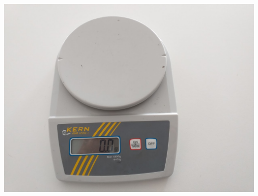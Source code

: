 \documentclass[12pt,a4paper,oneside]{book}
\newcounter{testexample} %
\theoremstyle{esercizio}
\begin{document}
\begin{testexample}
	
\begin{minipage}{\linewidth}
	\centering
	\includegraphics[scale=0.14]{bilancia}
	\label{fig:bilancia}
\end{minipage}
	
	
\end{testexample}
\end{document}
